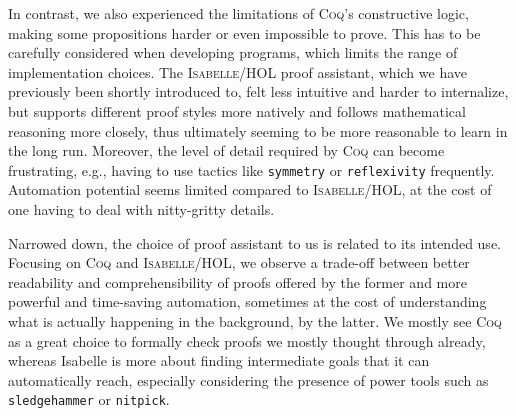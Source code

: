 In contrast, we also experienced the limitations of \textsc{Coq}'s constructive logic, making some propositions harder or even impossible to prove.
This has to be carefully considered when developing programs, which limits the range of implementation choices.
The \textsc{Isabelle/HOL} proof assistant, which we have previously been shortly introduced to, felt less intuitive and harder to internalize, but supports different proof styles more natively and follows mathematical reasoning more closely, thus ultimately seeming to be more reasonable to learn in the long run.
Moreover, the level of detail required by \textsc{Coq} can become frustrating, e.g., having to use tactics like \texttt{symmetry} or \texttt{reflexivity} frequently.
Automation potential seems limited compared to \textsc{Isabelle/HOL}, at the cost of one having to deal with nitty-gritty details.

Narrowed down, the choice of proof assistant to us is related to its intended use.
Focusing on \textsc{Coq} and \textsc{Isabelle/HOL}, we observe a trade-off between better readability and comprehensibility of proofs offered by the former and more powerful and time-saving automation, sometimes at the cost of understanding what is actually happening in the background, by the latter.
We mostly see \textsc{Coq} as a great choice to formally check proofs we mostly thought through already, whereas Isabelle is more about finding intermediate goals that it can automatically reach, especially considering the presence of power tools such as \texttt{sledgehammer} or \texttt{nitpick}.